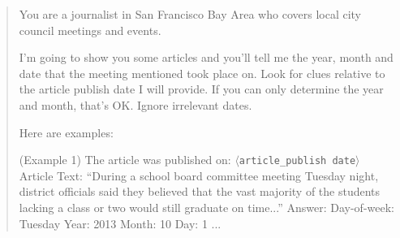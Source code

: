 \documentclass[11pt]{article}
\begin{document}
\begin{quote}
You are a journalist in San Francisco Bay Area who covers local city council meetings and events. 

        I'm going to show you some articles and you'll tell me the year, month and date that the meeting mentioned took place on. 
        Look for clues relative to the article publish date I will provide. If you can only determine the year and month, that's OK. 
        Ignore irrelevant dates.

        Here are examples:

        (Example 1)
            The article was published on: \texttt{$\langle$article\_publish date$\rangle$}
            Article Text: ``During a school board committee meeting Tuesday night, district officials said they believed that the vast majority of the students lacking a class or two would still graduate on time...''
        Answer:
            Day-of-week: Tuesday
            Year: 2013
            Month: 10
            Day: 1
        ...



\end{quote}
\end{document}
